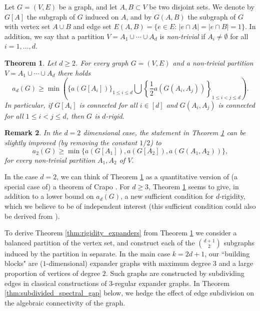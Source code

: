 \documentclass[a4paper,11pt]{article}
\theoremstyle{plain}
\newtheorem{theorem}{\bf Theorem}[section]
\newtheorem{remark}[theorem]{\bf Remark}
\theoremstyle{definition}
\begin{document}
Let $G=(V,E)$ be a graph, and let $A,B\subset V$ be two disjoint sets. We denote by $G[A]$ the subgraph of $G$ induced on $A$, and by $G(A,B)$ the subgraph of $G$ with vertex set $A\cup B$ and edge set $E(A,B)=\{e\in E:\, |e\cap A|=|e\cap B|=1\}$. In addition, we say that a partition $V=A_1\cup\cdots\cup A_d$ is \emph{non-trivial} if $A_i\neq \emptyset$ for all $i=1,\ldots,d$. 

\begin{theorem}\label{thm:lower_bound_general_d}
Let $d\ge 2$. For every graph $G=(V,E)$ and a non-trivial partition $V=A_1\cup \cdots\cup A_d$ there holds
\[
a_d(G)\geq \min\left(\bigg\{a(G[A_i]) \bigg\}_{1\leq i\leq d} \bigcup\left\{\frac{1}{2}a(G(A_i,A_j))\right\}_{1\leq i<j\leq d}\right).
\]
In particular, if $G[A_i]$ is connected for all $i\in[d]$ and $G(A_i,A_j)$ is connected for all $1\leq i< j\leq d$, then $G$ is $d$-rigid.
\end{theorem}

\begin{remark}\label{rem:2d}
In the $d=2$ dimensional case, the statement in Theorem \ref{thm:lower_bound_general_d} can be slightly improved (by removing the constant $1/2$) to
\[a_2(G)\geq \min\{a(G[A_1]), a(G[A_2]),a(G(A_1,A_2))\},\] for every non-trivial partition $A_1,A_2$  of $V$.
\end{remark}

In the case $d=2$, we can think of Theorem \ref{thm:lower_bound_general_d} as a quantitative version of (a special case of) a theorem of Crapo \cite[Theorem 7]{crapo1990generic}. For $d\geq 3$, Theorem \ref{thm:lower_bound_general_d} seems to give, in addition to a lower bound on $a_d(G)$, a new sufficient condition for $d$-rigidity, which we believe to be of independent interest (this sufficient condition could also be derived from \cite[Theorem 5.5]{lindemann2022combinatorial}).



To derive Theorem \ref{thm:rigidity_expanders} from Theorem \ref{thm:lower_bound_general_d} we consider a balanced partition of the vertex set, and construct each of the $\binom{d+1}{2}$ subgraphs induced by the partition in separate. In the main case $k=2d+1$, our ``building blocks" are ($1$-dimensional) expander graphs with maximum degree $3$ and a large proportion of vertices of degree $2$. Such graphs are constructed by subdividing edges in  classical constructions of $3$-regular expander graphs. In Theorem \ref{thm:subdivided_spectral_gap} below, we hedge the effect of edge subdivision on the algebraic connectivity of the graph.
\end{document}

